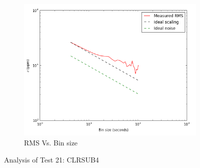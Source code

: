 \documentclass{aastex6}
\begin{document}
\begin{figure}[H]
    \begin{subfigure}{3}
        \includegraphics[scale=0.6]{rms_test21}
        \caption{RMS Vs. Bin size}
    \end{subfigure}
    \caption{Analysis of Test 21: CLRSUB4}
\end{figure}
\end{document}
